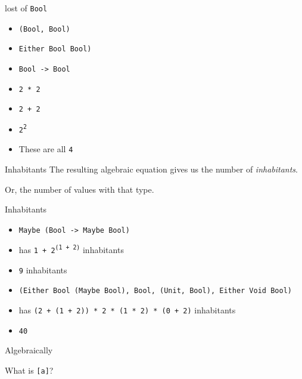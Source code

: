 \begin{frame}
\begin{block}{lost of \lstinline{Bool}}
\begin{itemize}
  \item<1-> \lstinline{(Bool, Bool)}
  \item<1-> \lstinline{Either Bool Bool)}
  \item<1-> \lstinline{Bool -> Bool}
  \item<2-> \lstinline{2 * 2}
  \item<2-> \lstinline{2 + 2}
  \item<2-> \lstinline{2}\textsuperscript{\lstinline{2}}
  \item<3-> These are all \lstinline{4}
\end{itemize}
\end{block}
\end{frame}

\begin{frame}
\begin{block}{Inhabitants}
The resulting algebraic equation gives us the number of \emph{inhabitants}.

Or, the number of values with that type.
\end{block}
\end{frame}

\begin{frame}
\begin{block}{Inhabitants}
\begin{itemize}
  \item<1-> \lstinline{Maybe (Bool -> Maybe Bool)}
  \item<1-> has \lstinline{1 + 2}\textsuperscript{\lstinline{(1 + 2)}} inhabitants
  \item<1-> \lstinline{9} inhabitants
  \item<2-> \scriptsize{\lstinline{(Either Bool (Maybe Bool), Bool, (Unit, Bool), Either Void Bool)}}
  \item<2-> has \lstinline{(2 + (1 + 2)) * 2 * (1 * 2) * (0 + 2)} inhabitants
  \item<2-> \lstinline{40}
\end{itemize}
\end{block}
\end{frame}

\begin{frame}
\begin{block}{Algebraically}
\begin{center}
What is \lstinline{[a]}?
\end{center}
\end{block}
\end{frame}

